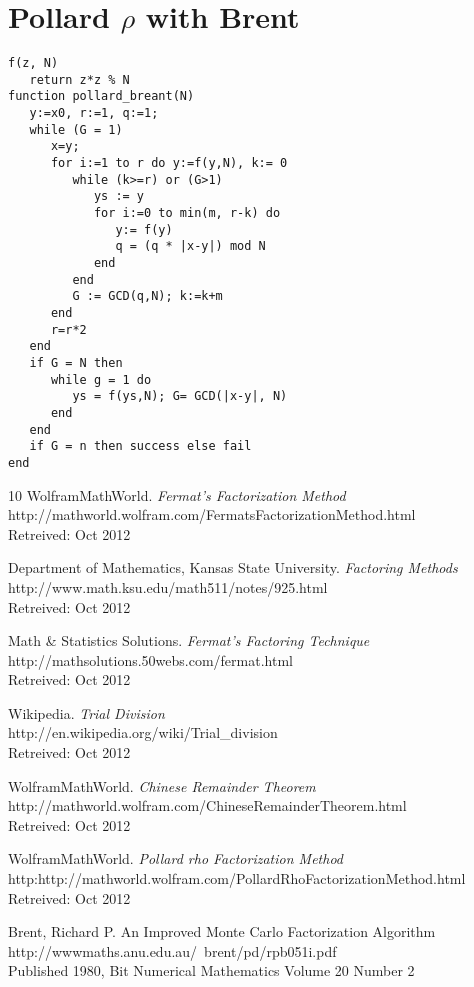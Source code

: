 \documentclass[a4paper, 12pt]{report}
\begin{document}
\section{Pollard $\rho$ with Brent}
\begin{lstlisting}[frame=single]
f(z, N)
   return z*z % N
function pollard_breant(N)
   y:=x0, r:=1, q:=1;
   while (G = 1)
      x=y;
      for i:=1 to r do y:=f(y,N), k:= 0
         while (k>=r) or (G>1)
            ys := y
            for i:=0 to min(m, r-k) do
               y:= f(y)
               q = (q * |x-y|) mod N
            end
         end
         G := GCD(q,N); k:=k+m
      end
      r=r*2
   end
   if G = N then
      while g = 1 do
         ys = f(ys,N); G= GCD(|x-y|, N)
      end
   end
   if G = n then success else fail
end
\end{lstlisting}
\begin{thebibliography} {10}
	WolframMathWorld.
	\emph{Fermat's Factorization Method} \\
	http://mathworld.wolfram.com/FermatsFactorizationMethod.html \\
	Retreived: Oct 2012
	
	Department of Mathematics, Kansas State University.
	\emph{Factoring Methods} \\
	http://www.math.ksu.edu/math511/notes/925.html \\
	Retreived: Oct 2012
	
	Math \& Statistics Solutions.
	\emph{Fermat's Factoring Technique} \\
	http://mathsolutions.50webs.com/fermat.html \\
	Retreived: Oct 2012

	Wikipedia.
	\emph{Trial Division} \\
	http://en.wikipedia.org/wiki/Trial\_division \\
	Retreived: Oct 2012

	WolframMathWorld.
	\emph{Chinese Remainder Theorem} \\
	http://mathworld.wolfram.com/ChineseRemainderTheorem.html \\
	Retreived: Oct 2012

	WolframMathWorld.
	\emph{Pollard rho Factorization Method} \\
	http:http://mathworld.wolfram.com/PollardRhoFactorizationMethod.html \\
	Retreived: Oct 2012

	Brent, Richard P. An Improved Monte Carlo Factorization Algorithm \\
	http://wwwmaths.anu.edu.au/~brent/pd/rpb051i.pdf \\
	Published 1980, Bit Numerical Mathematics Volume 20 Number 2

\end{thebibliography}
\end{document}
